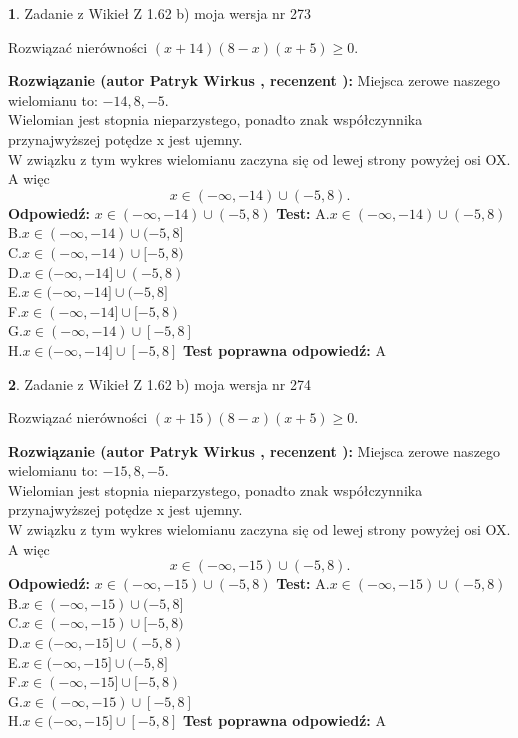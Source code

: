 \documentclass[12pt, a4paper]{article}
\theoremstyle{definition} %
\newtheorem{zad}{}
\newcommand{\zadStart}[1]{\begin{zad}#1\newline}
\newcommand{\zadStop}{\end{zad}}
\newcommand{\rozwStart}[2]{\noindent \textbf{Rozwiązanie (autor #1 , recenzent #2): }\newline}
\newcommand{\rozwStop}{\newline}
\newcommand{\odpStart}{\noindent \textbf{Odpowiedź:}\newline}
\newcommand{\odpStop}{\newline}
\newcommand{\testStart}{\noindent \textbf{Test:}\newline}
\newcommand{\testStop}{\newline}
\newcommand{\kluczStart}{\noindent \textbf{Test poprawna odpowiedź:}\newline}
\newcommand{\kluczStop}{\newline}
\begin{document}
\zadStart{Zadanie z Wikieł Z 1.62 b) moja wersja nr 273}

Rozwiązać nierówności $(x+14)(8-x)(x+5)\ge0$.
\zadStop
\rozwStart{Patryk Wirkus}{}
Miejsca zerowe naszego wielomianu to: $-14, 8, -5$.\\
Wielomian jest stopnia nieparzystego, ponadto znak współczynnika przy\linebreak najwyższej potędze x jest ujemny.\\ W związku z tym wykres wielomianu zaczyna się od lewej strony powyżej osi OX. A więc $$x \in (-\infty,-14) \cup (-5,8).$$
\rozwStop
\odpStart
$x \in (-\infty,-14) \cup (-5,8)$
\odpStop
\testStart
A.$x \in (-\infty,-14) \cup (-5,8)$\\
B.$x \in (-\infty,-14) \cup (-5,8]$\\
C.$x \in (-\infty,-14) \cup [-5,8)$\\
D.$x \in (-\infty,-14] \cup (-5,8)$\\
E.$x \in (-\infty,-14] \cup (-5,8]$\\
F.$x \in (-\infty,-14] \cup [-5,8)$\\
G.$x \in (-\infty,-14) \cup [-5,8]$\\
H.$x \in (-\infty,-14] \cup [-5,8]$
\testStop
\kluczStart
A
\kluczStop



\zadStart{Zadanie z Wikieł Z 1.62 b) moja wersja nr 274}

Rozwiązać nierówności $(x+15)(8-x)(x+5)\ge0$.
\zadStop
\rozwStart{Patryk Wirkus}{}
Miejsca zerowe naszego wielomianu to: $-15, 8, -5$.\\
Wielomian jest stopnia nieparzystego, ponadto znak współczynnika przy\linebreak najwyższej potędze x jest ujemny.\\ W związku z tym wykres wielomianu zaczyna się od lewej strony powyżej osi OX. A więc $$x \in (-\infty,-15) \cup (-5,8).$$
\rozwStop
\odpStart
$x \in (-\infty,-15) \cup (-5,8)$
\odpStop
\testStart
A.$x \in (-\infty,-15) \cup (-5,8)$\\
B.$x \in (-\infty,-15) \cup (-5,8]$\\
C.$x \in (-\infty,-15) \cup [-5,8)$\\
D.$x \in (-\infty,-15] \cup (-5,8)$\\
E.$x \in (-\infty,-15] \cup (-5,8]$\\
F.$x \in (-\infty,-15] \cup [-5,8)$\\
G.$x \in (-\infty,-15) \cup [-5,8]$\\
H.$x \in (-\infty,-15] \cup [-5,8]$
\testStop
\kluczStart
A
\kluczStop
\end{document}
